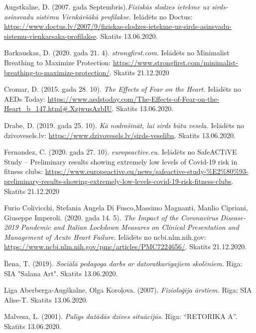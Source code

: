 \documentclass[12pt]{article}
\begin{document}
\begingroup
\renewcommand{\section}[2]{}
\begin{thebibliography}{9}
Augstkalne, D. (2007. gada Septembris).\textit{Fiziskās slodzes ietekme uz sirds-asinsvadu sistēmu Vienkāršākā profilakse.} Ielādēts no Doctus: \url{https://www.doctus.lv/2007/9/fiziskas-slodzes-ietekme-uz-sirds-asinsvadu-sistemu-vienkarsaka-profilakse}. Skatīts 13.06.2020. 

Barkauskas, D. (2020. gada 21. 4). \textit{strongfirst.com.} Ielādēts no Minimalist Breathing to Maximize Protection: \url{https://www.strongfirst.com/minimalist-breathing-to-maximize-protection/}. Skatīts 21.12.2020

Cromar, D. (2015. gada 28. 10). \textit{The Effects of Fear on the Heart.} Ielādēts no AEDs Today: \url{https://www.aedstoday.com/The-Effects-of-Fear-on-the-Heart_b_147.html#.XzjwusAzbIU}. Skatīts 13.06.2020.

Drabe, D. (2019. gada 25. 10). \textit{Kā nodrošināt, lai sirds būtu vesela.} Ielādēts no dzivovesels.lv: \url{https://www.dzivovesels.lv/sirds-veseliba}. Skatīts 13.06.2020.

Fernandez, C. (2020. gada 27. 10). \textit{europeactive.eu.} Ielādēts no SafeACTiVE Study – Preliminary results showing extremely low levels of Covid-19 risk in fitness clubs: \url{https://www.europeactive.eu/news/safeactive-study-%E2%80%93-preliminary-results-showing-extremely-low-levels-covid-19-risk-fitness-clubs}. Skatīts 21.12.2020

Furio Colivicchi, Stefania Angela Di Fusco,Massimo Magnanti, Manlio Cipriani, Giuseppe Imperoli. (2020. gada 14. 5). \textit{The Impact of the Coronavirus Disease-2019 Pandemic and Italian Lockdown Measures on Clinical Presentation and Management of Acute Heart Failure.} Ielādēts no ncbi.nlm.nih.gov: \url{https://www.ncbi.nlm.nih.gov/pmc/articles/PMC7224656/}. Skatīts 21.12.2020.

Īlena, T. (2019). \textit{Sociālā pedagoga darbs ar datoratkarīgajiem skolēniem.} Rīga: SIA "Salana Art". Skatīts 13.06.2020.

Līga Aberberga-Augškalne, Olga Koroļova. (2007). \textit{Fizioloģija ārstiem.} Rīga: SIA Alise-T. Skatīts 13.06.2020.

Malvesa, L. (2001). \textit{Palīgs dažādās dzīves situācijās.} Rīga: ``RETORIKA A''. Skatīts 13.06.2020.


\end{thebibliography}
\end{document}

